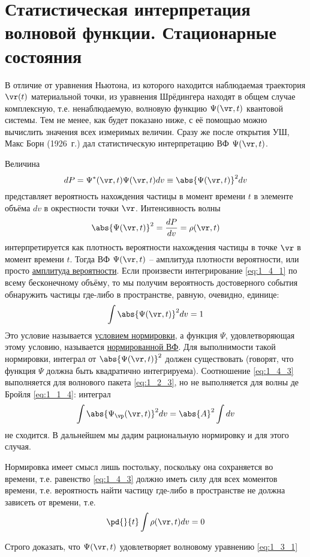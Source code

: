\begin{sloppypar}
  \section{Статистическая интерпретация волновой функции. Стационарные состояния}
\end{sloppypar}

В отличие от уравнения Ньютона, из которого находится наблюдаемая траектория $\vr(t)$ материальной точки, из уравнения Шрёдингера находят в общем случае комплексную, т.е. ненаблюдаемую, волновую функцию $\Psi(\vr, t)$ квантовой системы. Тем не менее, как будет показано ниже, с её помощью можно вычислить значения всех измеримых величин. Сразу же после открытия УШ, Макс Борн (1926~г.) дал статистическую интерпретацию ВФ $\Psi(\vr, t)$.

Величина
\begin{equation}
\label{eq:1_4_1}
dP = \Psi^*(\vr,t) \Psi(\vr,t) dv \equiv \abs{\Psi(\vr,t)}^2dv
\end{equation}%
%
представляет вероятность нахождения частицы в момент времени $t$ в элементе объёма $dv$ в окрестности точки $\vr$. Интенсивность волны
\begin{equation}
\label{eq:1_4_2}
\abs{\Psi(\vr,t)}^2 = \frac{dP}{dv} = \rho(\vr,t)
\end{equation}%
%
интерпретируется как плотность вероятности нахождения частицы в точке $\vr$ в момент времени $t$. Тогда ВФ $\Psi(\vr, t)$ -- амплитуда плотности вероятности, или просто \underline{амплитуда вероятности}. Если произвести интегрирование \eqref{eq:1_4_1} по всему бесконечному объёму, то мы получим вероятность достоверного события обнаружить частицы где-либо в пространстве, равную, очевидно, единице:
\begin{equation}
\label{eq:1_4_3}
\int \abs{\Psi(\vr,t)}^2 dv = 1
\end{equation}
Это условие называется \underline{условием нормировки}, а функция $\Psi$, удовлетворяющая этому условию, называется \underline{нормированной ВФ}. Для выполнимости такой нормировки, интеграл от $\abs{\Psi(\vr,t)}^2$ должен существовать (говорят, что функция $\Psi$ должна быть квадратично интегрируема). Соотношение \eqref{eq:1_4_3} выполняется для волнового пакета \eqref{eq:1_2_3}, но не выполняется для волны де Бройля \eqref{eq:1_1_4}: интеграл
$$
\int \abs{\Psi_{\vp}(\vr,t)}^2 dv = \abs{A}^2 \int dv
$$
не сходится. В дальнейшем мы дадим рациональную нормировку и для этого случая.

Нормировка имеет смысл лишь постольку, поскольку она сохраняется во времени, т.е. равенство \eqref{eq:1_4_3} должно иметь силу для всех моментов времени, т.е. вероятность найти частицу где-либо в пространстве не должна зависеть от времени, т.е.
$$
\pd{}{t} \int \rho(\vr,t) dv = 0
$$
\begin{excr}
Строго доказать, что $\Psi(\vr,t)$ удовлетворяет волновому уравнению \eqref{eq:1_3_1}
\end{excr}

